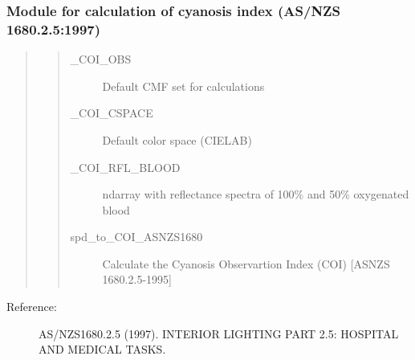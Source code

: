 \documentclass[letterpaper,10pt,english]{sphinxmanual}
\begin{document}
\subsubsection{Module for calculation of cyanosis index (AS/NZS 1680.2.5:1997)}
\label{\detokenize{toolboxes:module-for-calculation-of-cyanosis-index-as-nzs-1680-2-5-1997}}\begin{quote}
\begin{quote}\begin{description}
\item[{\_COI\_OBS}] \leavevmode
Default CMF set for calculations

\item[{\_COI\_CSPACE}] \leavevmode
Default color space (CIELAB)

\item[{\_COI\_RFL\_BLOOD}] \leavevmode
ndarray with reflectance spectra of 100\% and 50\% 
oxygenated blood

\item[{spd\_to\_COI\_ASNZS1680}] \leavevmode
Calculate the Cyanosis Observartion Index (COI) 
{[}ASNZS 1680.2.5-1995{]}

\end{description}\end{quote}
\end{quote}
\begin{description}
\item[{Reference:}] \leavevmode
AS/NZS1680.2.5 (1997). INTERIOR LIGHTING PART 2.5: HOSPITAL AND MEDICAL TASKS.

\end{description}
\end{document}
